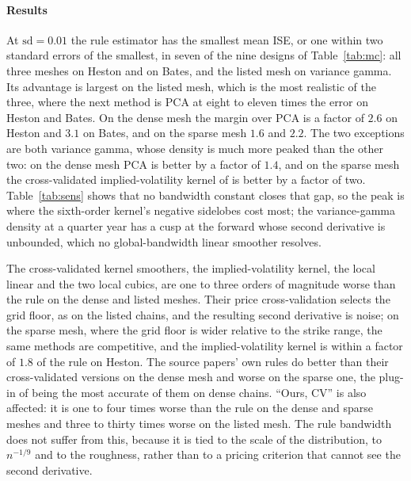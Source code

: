 \documentclass[preprint,12pt,authoryear,times]{elsarticle}
\begin{document}
\paragraph{Results}
At \(\mathrm{sd}=0.01\) the rule estimator has the smallest mean ISE, or one within two standard errors of the smallest, in seven of the nine designs of Table~\ref{tab:mc}: all three meshes on Heston and on Bates, and the listed mesh on variance gamma. Its advantage is largest on the listed mesh, which is the most realistic of the three, where the next method is PCA at eight to eleven times the error on Heston and Bates. On the dense mesh the margin over PCA is a factor of \(2.6\) on Heston and \(3.1\) on Bates, and on the sparse mesh \(1.6\) and \(2.2\). The two exceptions are both variance gamma, whose density is much more peaked than the other two: on the dense mesh PCA is better by a factor of \(1.4\), and on the sparse mesh the cross-validated implied-volatility kernel of \citeauthor{aitsahalia1998} is better by a factor of two. Table~\ref{tab:sens} shows that no bandwidth constant closes that gap, so the peak is where the sixth-order kernel's negative sidelobes cost most; the variance-gamma density at a quarter year has a cusp at the forward whose second derivative is unbounded, which no global-bandwidth linear smoother resolves.

The cross-validated kernel smoothers, the implied-volatility kernel, the local linear and the two local cubics, are one to three orders of magnitude worse than the rule on the dense and listed meshes. Their price cross-validation selects the grid floor, as on the listed chains, and the resulting second derivative is noise; on the sparse mesh, where the grid floor is wider relative to the strike range, the same methods are competitive, and the implied-volatility kernel is within a factor of \(1.8\) of the rule on Heston. The source papers' own rules do better than their cross-validated versions on the dense mesh and worse on the sparse one, the plug-in of \citeauthor{aitsahalia2003} being the most accurate of them on dense chains. ``Ours, CV'' is also affected: it is one to four times worse than the rule on the dense and sparse meshes and three to thirty times worse on the listed mesh. The rule bandwidth does not suffer from this, because it is tied to the scale of the distribution, to \(n^{-1/9}\) and to the roughness, rather than to a pricing criterion that cannot see the second derivative.
\end{document}
